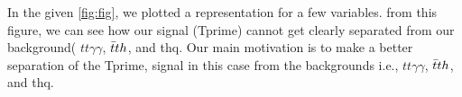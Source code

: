 In the given \autoref{fig:fig}, we plotted a representation for a few variables. from this figure, we can see how our signal (Tprime) cannot get clearly separated from our background( $tt\gamma \gamma$, $\Bar{t}th$, and thq. Our main motivation is to make a better separation of the Tprime, signal in this case from the backgrounds i.e., $tt\gamma\gamma$, $\Bar{t}th$, and thq.







































    
        
    
    

\setcounter{equation}{0}
\setcounter{table}{0}
\setcounter{figure}{0}


